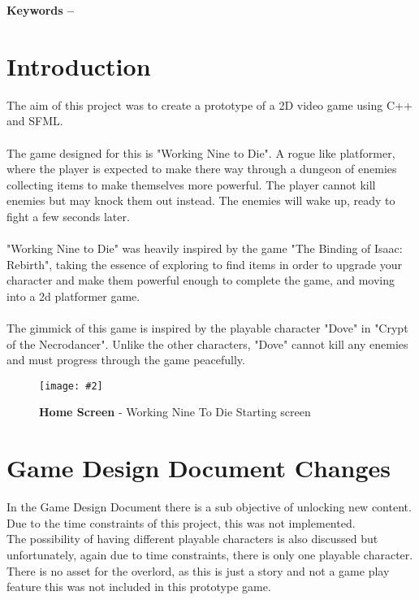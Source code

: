\documentclass[10pt, a4paper]{article}
\title{\mytitle}
\author{\myauthor\hspace{1em}\\\contact\\Edinburgh Napier University\hspace{0.5em}-\hspace{0.5em}\mymodule}
\date{}
\newcommand{\figuremacro}[5]{
    \begin{figure}[#1]
        \centering
        \texttt{[image: \#2]}
        \caption[#3]{\textbf{#3}#4}
        \label{fig:#2}
    \end{figure}
}
\begin{document}
	\maketitle
    
	\textbf{Keywords -- }{\mykeywords}
	\section{Introduction}
	
	The aim of this project was to create a prototype of a 2D video game using C++ and SFML. \\\\
	The game designed for this is "Working Nine to Die". A rogue like platformer, where the player is expected to make there way through a dungeon of enemies collecting items to make themselves more powerful. The player cannot kill enemies but may knock them out instead. The enemies will wake up, ready to fight a few seconds later.\\\\
	"Working Nine to Die" was heavily inspired by the game "The Binding of Isaac: Rebirth", taking the essence of exploring to find items in order to upgrade your character and make them powerful enough to complete the game, and moving into a 2d platformer game.\\\\
	The gimmick of this game is inspired by the playable character "Dove" in "Crypt of the Necrodancer". Unlike the other characters, "Dove" cannot kill any enemies and must progress through the game peacefully.
    
    \figuremacro{h}{Home}{Home Screen}{ - Working Nine To Die Starting screen}{1.0}
	
	\section {Game Design Document Changes}
	In the Game Design Document there is a sub objective of unlocking new content. Due to the time constraints of this project, this was not implemented.\\
	
	The possibility of having different playable characters is also discussed but unfortunately, again due to time constraints, there is only one playable character.\\
	
	There is no asset for the overlord, as this is just a story and not a game play feature this was not included in this prototype game.
	
\end{document}
